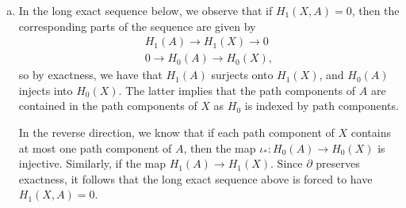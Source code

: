 \documentclass[10pt]{mypackage}
\begin{document}
\begin{solution}
\begin{enumerate}[(a)]
      Now, if $A$ intersects each path component of $X$ non-trivially, then there is an injection from the path components of $X$ into the path components of $A$, meaning that $H_0\left( X \right)\leq H_0\left( A \right)$ as subgroups. Yet, since the boundary map on chains descends to the quotients $C_0\left( X \right)/C_0\left( A \right)$ and $C_1\left( X \right)/C_1\left( A \right)$, we must have $H_0\left( A \right)\leq H_0\left( X \right)$ are subgroups, so that $H_0\left( X \right)\cong H_0\left( A \right)$, and thus $H_0\left( X,A \right) = 0$.
    \item  In the long exact sequence below, we observe that if $H_1\left( X,A \right) = 0$, then the corresponding parts of the sequence are given by
      \begin{align*}
        H_1\left( A \right)\rightarrow H_1\left( X \right)\rightarrow 0\\
        0 \rightarrow H_0\left( A \right)\rightarrow H_0\left( X \right),
      \end{align*}
      so by exactness, we have that $H_1\left( A \right)$ surjects onto $H_1\left( X \right)$, and $H_0\left( A \right)$ injects into $H_0\left( X \right)$. The latter implies that the path components of $A$ are contained in the path components of $X$ as $H_0$ is indexed by path components.
      \begin{center}
      \end{center}
      In the reverse direction, we know that if each path component of $X$ contains at most one path component of $A$, then the map $\iota_{\ast}\colon H_0\left( A \right)\rightarrow H_0\left( X \right)$ is injective. Similarly, if the map $H_1\left( A \right)\rightarrow H_1\left( X \right)$. Since $\partial$ preserves exactness, it follows that the long exact sequence above is forced to have $H_1\left( X,A \right) = 0$.
  \end{enumerate}
\end{solution}
\end{document}
